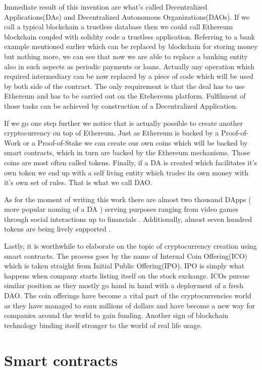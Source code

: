 \documentclass[a4paper,12pt,twoside,openany]{report}
\begin{document}
Immediate result of this invention are what's called Decentralized Applications(DAs) and Decentralized Autonomous Organizations(DAOs). If we call a typical blockchain a trustless database then we could call Ethereum blockchain coupled with solidity code a trustless application. Referring to a bank example mentioned earlier which can be replaced by blockchain for storing money but nothing more, we can see that now we are able to replace a banking entity also in such aspects as periodic payments or loans. Actually any operation which required intermediary can be now replaced by a piece of code which will be used by both side of the contract. The only requirement is that the deal has to use Ethereum and has to be carried out on the Etehereum platform. Fulfilment of those tasks can be achieved by construction of a Decentralized Application. 

If we go one step further we notice that is actually possible to create another cryptocurrency on top of Ethereum. Just as Ethereum is backed by a Proof-of-Work or a Proof-of-Stake we can create our own coins which will be backed by smart contracts, which in turn are backed by the Ethereum mechanisms. Those coins are most often called tokens. Finally, if a DA is created which facilitates it's own token we end up with a self living entity which trades its own money with it's own set of rules. That is what we call DAO.

As for the moment of writing this work there are almost two thousand DApps ( more popular naming of a DA ) serving purposes ranging from video games through social interactions up to financials \cite{dapps}.  Additionally, almost seven hundred tokens are being lively supported \cite{tokens}. 

Lastly, it is worthwhile to elaborate on the topic of cryptocurrency creation using smart contracts. The process goes by the name of Internal Coin Offering(ICO) which is taken straight from Initial Public Offering(IPO). IPO is simply what happens when company starts listing itself on the stock exchange. ICOs  pursue similar position as they mostly go hand in hand with a deployment of a fresh DAO. The coin offerings have become a vital part of the cryptocurrencies world as they have managed to earn millions of dollars and have become a new way for companies around the world to gain funding. Another sign of blockchain technology binding itself stronger to the world of real life usage.

\section{Smart contracts}
\end{document}
